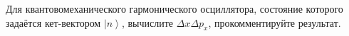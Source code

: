 \documentclass[__main__.tex]{subfiles}
\begin{document}
Для квантовомеханического гармонического осциллятора, состояние которого задаётся кет-вектором $\left|n\right>$, вычислите $\Delta{x}\Delta{p_x}$, прокомментируйте результат.\\ 

\end{document}
